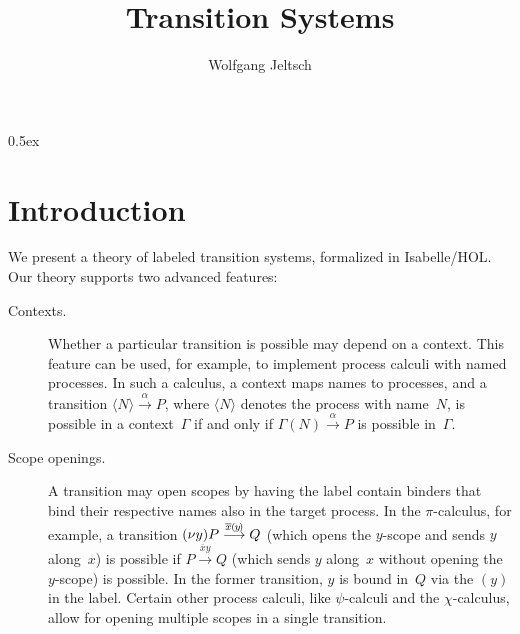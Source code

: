 \documentclass[a4paper,11pt]{article}
\begin{document}
\title{Transition Systems}
\author{Wolfgang Jeltsch}

\maketitle

\tableofcontents

\parindent 0pt\parskip 0.5ex

\section{Introduction}

We present a theory of labeled transition systems, formalized in Isabelle/HOL. Our theory supports
two advanced features:
\begin{description}

\item[Contexts.]

Whether a particular transition is possible may depend on a context. This feature can be used, for
example, to implement process calculi with named processes. In such a calculus, a context maps names
to processes, and a transition $\langle N\rangle \overset{\alpha}{\longrightarrow} P$, where
$\langle N\rangle$ denotes the process with name~$N$, is possible in a context~$\Gamma$ if and only
if $\Gamma(N) \overset{\alpha}{\longrightarrow} P$ is possible in~$\Gamma$.

\item[Scope openings.]

A transition may open scopes by having the label contain binders that bind their respective names
also in the target process. In the $\pi$-calculus, for example, a transition
$(\nu y)P \overset{\overline{x}\hspace{-0.03em}(\hspace{-.06em}y\hspace{-.12em})}{\longrightarrow}
Q$ (which opens the $y$-scope and sends $y$ along~$x$) is possible if $P
\overset{\overline{x}y}{\longrightarrow} Q$ (which sends $y$ along~$x$ without opening the
$y$-scope) is possible. In the former transition, $y$ is bound in~$Q$ via the $(y)$ in the label.
Certain other process calculi, like $\psi$-calculi and the $\chi$-calculus, allow for opening
multiple scopes in a single transition.

\end{description}


\end{document}
